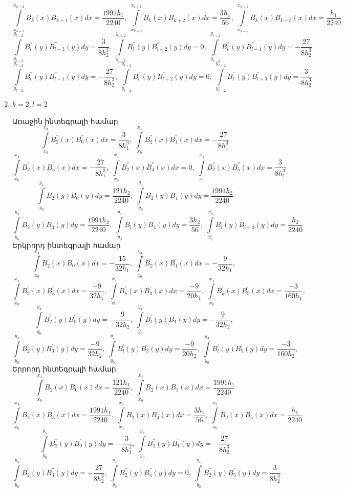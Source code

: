 \documentclass[fleqn, bachelor,subf,12pt,notitlepage]{article}
\begin{document}
\begin{enumerate}
$$\int \limits_{x_{k-2}}^{x_{k+2}}B_{k}(x)B_{k+1}(x)dx=\dfrac{1991h_{1}}{2240}, \; \int \limits_{x_{k-2}}^{x_{l+2}}B_{k}(x)B_{k+2}(x)dx=\dfrac{3h_{1}}{56}, \; \int \limits_{x_{k-2}}^{x_{k+2}}B_{k}(x)B_{k+3}(x)dx=\dfrac{h_{1}}{2240}$$
$$\int \limits_{y_{l-2}}^{y_{l+2}}B_{l}^{''}(y)B_{l-3}^{''}(y)dy = \dfrac{3}{8h_{2}^3}, \; \int \limits_{y_{l-2}}^{y_{l+2}}B_{l}^{''}(y)B_{l-2}^{''}(y)dy = 0, \; \int \limits_{y_{l-2}}^{y_{l+2}}B_{l}^{''}(y)B_{l-1}^{''}(y)dy = -\dfrac{27}{8h_{2}^3}$$
$$\int \limits_{y_{l-2}}^{y_{l+2}}B_{l}^{''}(y)B_{l+1}^{''}(y)dy =-\dfrac{27}{8h_{2}^3}, \; \int \limits_{y_{l-2}}^{y_{l+2}}B_{l}^{''}(y)B_{l+2}^{''}(y)dy = 0, \; \int \limits_{y_{l-2}}^{y_{l+2}}B_{l}^{''}(y)B_{l+3}^{''}(y)dy =  \dfrac{3}{8h_{2}^3}$$

\item{$k=2,  l =2 $}

Առաջին ինտեգրալի համար
$$\int \limits_{x_{0}}^{x_{4}}B_{2}^{''}(x)B_{0}^{''}(x)dx = \dfrac{3}{8h_{1}^3}, \; \int \limits_{x_{0}}^{x_{4}}B_{2}^{''}(x)B_{1}^{''}(x)dx = -\dfrac{27}{8h_{1}^3}$$
$$\int \limits_{x_{0}}^{x_{4}}B_{2}^{''}(x)B_{3}^{''}(x)dx =-\dfrac{27}{8h_{1}^3}, \; \int \limits_{x_{0}}^{x_{4}}B_{2}^{''}(x)B_{4}^{''}(x)dx = 0, \; \int \limits_{x_{0}}^{x_{4}}B_{2}^{''}(x)B_{5}^{''}(x)dx =  \dfrac{3}{8h_{1}^3}$$
$$ \int \limits_{y_{0}}^{y_{4}}B_{2}(y)B_{0}(y)dy=\dfrac{121h_{2}}{2240}, \; \int \limits_{y_{0}}^{y_{4}}B_{2}(y)B_{1}(y)dy=\dfrac{1991h_{2}}{2240}$$
$$\int \limits_{y_{0}}^{y_{4}}B_{2}(y)B_{3}(y)dy=\dfrac{1991h_{2}}{2240}, \; \int \limits_{y_{0}}^{y_{4}}B_{l}(y)B_{4}(y)dy=\dfrac{3h_{2}}{56}, \; \int \limits_{y_{0}}^{y_{4}}B_{l}(y)B_{l+3}(y)dy=\dfrac{h_{2}}{2240}$$
Երկրորդ ինտեգրալի համար
$$\int \limits_{x_{0}}^{x_{4}}B_{2}^{'}(x)B_{0}^{'}(x)dx=-\dfrac{15}{32h_{1}}, \; \int \limits_{x_{0}}^{x_{4}}B_{2}^{'}(x)B_{1}^{'}(x)dx=-\dfrac{9}{32h_{1}}, \;$$
$$\int \limits_{x_{0}}^{x_{4}}B_{2}^{'}(x)B_{3}^{'}(x)dx=\dfrac{-9}{32h_{1}}, \; \int \limits_{x_{0}}^{x_{4}}B_{k}^{'}(x)B_{3}^{'}(x)dx=\dfrac{-9}{20h_{1}}, \; \int \limits_{x_{0}}^{x_{4}}B_{k}^{'}(x)B_{5}^{'}(x)dx=\dfrac{-3}{160h_{1}}, \;$$
$$\int \limits_{y_{0}}^{y_{4}}B_{2}^{'}(y)B_{0}^{'}(y)dy=-\dfrac{9}{32h_{2}}, \; \int \limits_{y_{0}}^{y_{4}}B_{l}^{'}(y)B_{1}^{'}(y)dy=-\dfrac{9}{32h_{2}}, \;$$
$$\int \limits_{y_{0}}^{y_{4}}B_{2}^{'}(y)B_{3}^{'}(y)dy=\dfrac{-9}{32h_{2}}, \; \int \limits_{y_{0}}^{y_{4}}B_{l}^{'}(y)B_{3}^{'}(y)dy=\dfrac{-9}{20h_{2}}, \; \int \limits_{y_{0}}^{y_{4}}B_{l}^{'}(y)B_{5}^{'}(y)dy=\dfrac{-3}{160h_{2}}, \;$$
Երրորդ ինտեգրալի համար
$$\int \limits_{x_{0}}^{x_{4}}B_{2}(x)B_{0}(x)dx=\dfrac{121h_{1}}{2240}, \; \int \limits_{x_{0}}^{x_{4}}B_{2}(x)B_{1}(x)dx=\dfrac{1991h_{1}}{2240}$$
$$\int \limits_{x_{0}}^{x_{4}}B_{2}(x)B_{3}(x)dx=\dfrac{1991h_{1}}{2240}, \; \int \limits_{x_{0}}^{x_{4}}B_{2}(x)B_{4}(x)dx=\dfrac{3h_{1}}{56}, \; \int \limits_{x_{0}}^{x_{4}}B_{2}(x)B_{5}(x)dx=\dfrac{h_{1}}{2240}$$
$$\int \limits_{y_{0}}^{y_{4}}B_{2}^{''}(y)B_{0}^{''}(y)dy = -\dfrac{3}{8h_{1}^{2}}, \; \int \limits_{y_{0}}^{y_{4}}B_{2}^{''}(y)B_{1}^{''}(y)dy = -\dfrac{27}{8h_{2}^3}$$
$$\int \limits_{y_{0}}^{y_{4}}B_{2}^{''}(y)B_{3}^{''}(y)dy =-\dfrac{27}{8h_{2}^3}, \; \int \limits_{y_{0}}^{y_{4}}B_{2}^{''}(y)B_{4}^{''}(y)dy = 0, \; \int \limits_{y_{0}}^{y_{4}}B_{2}^{''}(y)B_{5}^{''}(y)dy =  \dfrac{3}{8h_{2}^3}$$


\end{enumerate}
\end{document}

